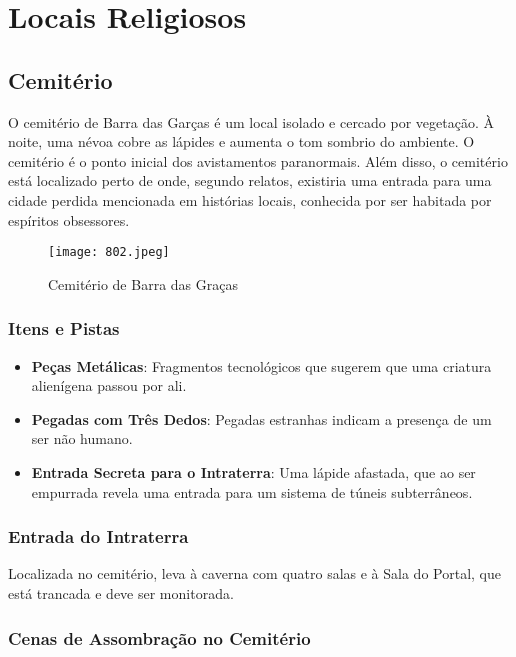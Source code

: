 \chapter{Locais Religiosos}

\section{Cemitério}

O cemitério de Barra das Garças é um local isolado e cercado por vegetação. À noite, uma névoa cobre as lápides e aumenta o tom sombrio do ambiente. O cemitério é o ponto inicial dos avistamentos paranormais. Além disso, o cemitério está localizado perto de onde, segundo relatos, existiria uma entrada para uma cidade perdida mencionada em histórias locais, conhecida por ser habitada por espíritos obsessores.

\begin{figure}[hbt]
    \centering
    \texttt{[image: 802.jpeg]}
    \caption{Cemitério de Barra das Graças}
    \label{fig:cemi}
\end{figure}

\subsection{Itens e Pistas}

\begin{itemize}
    \item \textbf{Peças Metálicas}: Fragmentos tecnológicos que sugerem que uma criatura alienígena passou por ali.
    \item \textbf{Pegadas com Três Dedos}: Pegadas estranhas indicam a presença de um ser não humano.
    \item \textbf{Entrada Secreta para o Intraterra}: Uma lápide afastada, que ao ser empurrada revela uma entrada para um sistema de túneis subterrâneos.
\end{itemize}

\subsection{Entrada do Intraterra}

Localizada no cemitério, leva à caverna com quatro salas e à Sala do Portal, que está trancada e deve ser monitorada.

\subsection{Cenas de Assombração no Cemitério}

